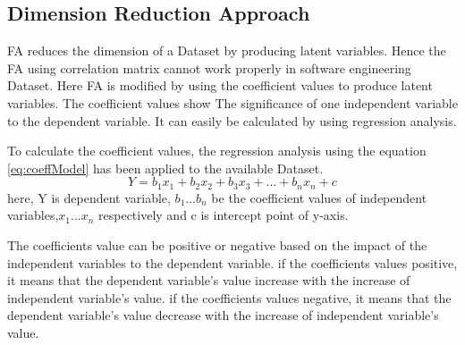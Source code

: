 \documentclass[12pt]{report}
\begin{document}
\subsection{Dimension Reduction Approach} 
 

FA reduces the dimension of a Dataset by producing latent variables. Hence the FA using correlation matrix cannot work properly in software engineering Dataset. Here FA is modified by using the coefficient values to produce latent variables. The coefficient values show The significance of one independent variable to the dependent variable. It can easily be calculated by using regression analysis. 

To calculate the coefficient values, the regression analysis using the equation \ref{eq:coeffModel} has been applied to the available Dataset. 
\begin{equation}
\label{eq:coeffModel}
 Y=b_{1}x_{1}+b_{2}x_{2}+b_{3}x_{3}+...+b_{n}x_{n}+c
\end{equation}
here, Y is dependent variable, $b_{1}$...$b_{n}$ be the coefficient values of independent variables,$x_{1}$...$x{_n}$ respectively and c is intercept point of y-axis. 


The coefficients value can be positive or negative based on the impact of the independent variables to the dependent variable. if the coefficients values positive, it means that the dependent variable's value increase with the increase of independent variable's value. if the coefficients values negative, it means that the dependent variable's value decrease with the increase of independent variable's value. 
 
\end{document}

